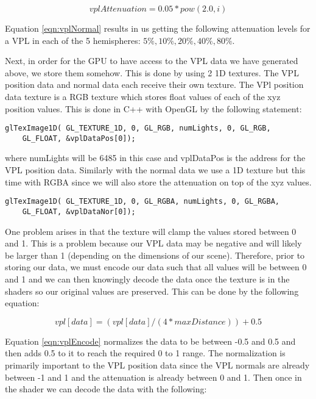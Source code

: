 \begin{equation}
vplAttenuation = 0.05*pow(2.0,i)\label{eqn:vplNormal}
\end{equation}

Equation \ref{eqn:vplNormal} results in us getting the following attenuation levels for a VPL in each of the 5 hemispheres: $5\%, 10\%, 20\%, 40\%, 80\%$.  

Next, in order for the GPU to have access to the VPL data we have generated above, we store them somehow.  This is done by using 2 1D textures.  The VPL position data and normal data each receive their own texture.  The VPl position data texture is a RGB texture which stores float values of each of the xyz position values.  This is done in C++ with OpenGL by the following statement:


\begin{lstlisting}
glTexImage1D( GL_TEXTURE_1D, 0, GL_RGB, numLights, 0, GL_RGB, 
	GL_FLOAT, &vplDataPos[0]);
\end{lstlisting}

where numLights will be 6485 in this case and vplDataPos is the address for the VPL position data.  Similarly with the normal data we use a 1D texture but this time with RGBA since we will also store the attenuation on top of the xyz values.


\begin{lstlisting}
glTexImage1D( GL_TEXTURE_1D, 0, GL_RGBA, numLights, 0, GL_RGBA, 
	GL_FLOAT, &vplDataNor[0]);
\end{lstlisting}

One problem arises in that the texture will clamp the values stored between 0 and 1.  This is a problem because our VPL data may be negative and will likely be larger than 1 (depending on the dimensions of our scene).  Therefore, prior to storing our data, we must encode our data such that all values will be between 0 and 1 and we can then knowingly decode the data once the texture is in the shaders so our original values are preserved.  This can be done by the following equation:

\begin{equation}
vpl[data] = (vpl[data]/(4*maxDistance))+0.5 \label{eqn:vplEncode}
\end{equation}

Equation \ref{eqn:vplEncode} normalizes the data to be between -0.5 and 0.5 and then adds 0.5 to it to reach the required 0 to 1 range.  The normalization is primarily important to the VPL position data since the VPL normals are already between -1 and 1 and the attenuation is already between 0 and 1. Then once in the shader we can decode the data with the following:

